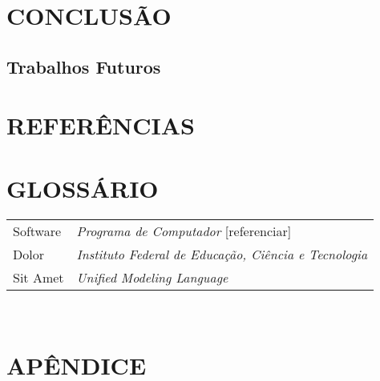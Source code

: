 \documentclass[12pt,a4paper]{article}
\begin{document}
	\section{CONCLUSÃO}

	\lipsum[1]

		\subsection{Trabalhos Futuros}

			\lipsum[1]

	\newpage


	\section*{REFERÊNCIAS}

	\printbibliography[heading=none]

	\newpage

	\section*{GLOSSÁRIO}

	\begin{tabular}{p{3cm} p{}}
	  Software & \textit{Programa de Computador} [referenciar] \\
	  Dolor & \textit{Instituto Federal de Educação, Ciência e Tecnologia} \\
	  Sit Amet & \textit{Unified Modeling Language} \\
	\end{tabular}\\


	\newpage

	\section*{APÊNDICE}

	\lipsum[1]

	\newpage
\end{document}
